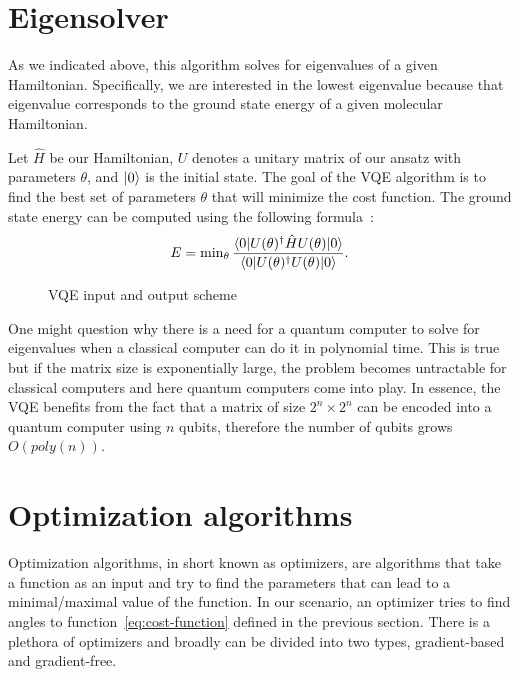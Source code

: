 \section{Eigensolver}
As we indicated above, this algorithm solves for eigenvalues of a given Hamiltonian. Specifically, we are interested in the lowest eigenvalue because that eigenvalue corresponds to the ground state energy of a given molecular Hamiltonian. 

Let $\hat{H}$ be our Hamiltonian, $U$ denotes a unitary matrix of our ansatz with parameters $\theta$, and $\lvert0\rangle$ is the initial state. The goal of the VQE algorithm is to find the best set of parameters $\theta$ that will minimize the cost function. The ground state energy can be computed using the following formula~\cite{vqe_method}:
\begin{equation}\label{eq:cost-function}
E = \min\nolimits_{\theta} \frac{\langle0\rvert U(\theta)^\dag \hat{H} U(\theta) \lvert0\rangle}{\langle0\rvert U(\theta)^\dag U(\theta) \lvert0\rangle} \text{.}
\end{equation}

\begin{figure}[H] 
    \caption{VQE input and output scheme}
\end{figure}

One might question why there is a need for a quantum computer to solve for eigenvalues when a classical computer can do it in polynomial time. This is true but if the matrix size is exponentially large, the problem becomes untractable for classical computers and here quantum computers come into play. In essence, the VQE benefits from the fact that a matrix of size $2^n \times 2^n$ can be encoded into a quantum computer using $n$ qubits, therefore the number of qubits grows $O(poly(n))$. 

\section{Optimization algorithms}
Optimization algorithms, in short known as optimizers, are algorithms that take a function as an input and try to find the parameters that can lead to a minimal/maximal value of the function. In our scenario, an optimizer tries to find angles to function~\ref{eq:cost-function} defined in the previous section. There is a plethora of optimizers and broadly can be divided into two types, gradient-based and gradient-free.

